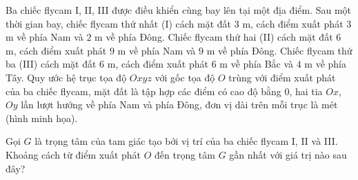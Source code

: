 \begin{ex}
Ba chiếc flycam I, II, III được điều khiển cùng bay lên tại một địa điểm. Sau một thời gian bay, chiếc flycam thứ nhất (I) cách mặt đất $3$ m, cách điểm xuất phát $3$ m về phía Nam và $2$ m về phía Đông. Chiếc flycam thứ hai (II) cách mặt đất $6$ m, cách điểm xuất phát $9$ m về phía Nam và $9$ m về phía Đông. Chiếc flycam thứ ba (III) cách mặt đất $6$ m, cách điểm xuất phát $6$ m về phía Bắc và $4$ m về phía Tây. Quy ước hệ trục tọa độ $Oxyz$ với gốc tọa độ $O$ trùng với điểm xuất phát của ba chiếc flycam, mặt đất là tập hợp các điểm có cao độ bằng $0$, hai tia $Ox$, $Oy$ lần lượt hướng về phía Nam và phía Đông, đơn vị dài trên mỗi trục là mét (hình minh họa).
\begin{center}
\end{center}
Gọi $G$ là trọng tâm của tam giác tạo bởi vị trí của ba chiếc flycam I, II và III. Khoảng cách từ điểm xuất phát $O$ đến trọng tâm $G$ gần nhất với giá trị nào sau đây?
\end{ex}
